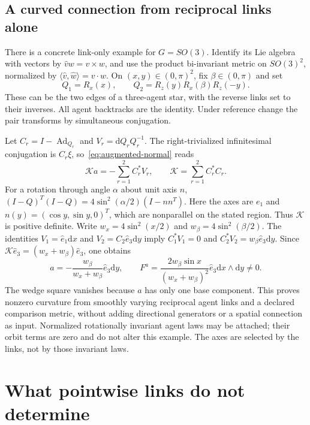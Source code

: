 \documentclass[11pt]{article}
\newcommand{\dd}{\mathrm d}
\newcommand{\Ad}{\operatorname{Ad}}
\begin{document}
\subsection{A curved connection from reciprocal links alone}

There is a concrete link-only example for $G=SO(3)$. Identify its Lie algebra with vectors by $\widehat v w=v\times w$, and use the product bi-invariant metric on $SO(3)^2$, normalized by $\langle\widehat v,\widehat w\rangle=v\cdot w$. On $(x,y)\in(0,\pi)^2$, fix $\beta\in(0,\pi)$ and set
\begin{equation}
 Q_1=R_x(x),\qquad Q_2=R_z(y)R_x(\beta)R_z(-y).
 \label{eq:SO3-links}
\end{equation}
These can be the two edges of a three-agent star, with the reverse links set to their inverses. All agent backtracks are the identity. Under reference change the pair transforms by simultaneous conjugation.

Let $C_r=I-\Ad_{Q_r}$ and $V_r=\dd Q_r Q_r^{-1}$. The right-trivialized infinitesimal conjugation is $C_r\xi$, so~\eqref{eq:augmented-normal} reads
\begin{equation}
 \mathcal K a=-\sum_{r=1}^2 C_r^*V_r,\qquad
 \mathcal K=\sum_{r=1}^2 C_r^*C_r.
 \label{eq:SO3-normal}
\end{equation}
For a rotation through angle $\alpha$ about unit axis $n$,
$(I-Q)^T(I-Q)=4\sin^2(\alpha/2)(I-nn^T)$. Here the axes are $e_1$ and $n(y)=(\cos y,\sin y,0)^T$, which are nonparallel on the stated region. Thus $\mathcal K$ is positive definite. Write $w_x=4\sin^2(x/2)$ and $w_\beta=4\sin^2(\beta/2)$. The identities
$V_1=\widehat e_1\dd x$ and $V_2=C_2\widehat e_3\dd y$ imply $C_1^*V_1=0$ and $C_2^*V_2=w_\beta\widehat e_3\dd y$. Since $\mathcal K\widehat e_3=(w_x+w_\beta)\widehat e_3$, one obtains
\begin{equation}
 a=-\frac{w_\beta}{w_x+w_\beta}\widehat e_3\dd y,\qquad
 F^a=\frac{2w_\beta\sin x}{(w_x+w_\beta)^2}\widehat e_3\dd x\wedge\dd y\ne0.
 \label{eq:SO3-curvature}
\end{equation}
The wedge square vanishes because $a$ has only one base component. This proves nonzero curvature from smoothly varying reciprocal agent links and a declared comparison metric, without adding directional generators or a spatial connection as input. Normalized rotationally invariant agent laws may be attached; their orbit terms are zero and do not alter this example. The axes are selected by the links, not by those invariant laws.

\section{What pointwise links do not determine}
\end{document}
